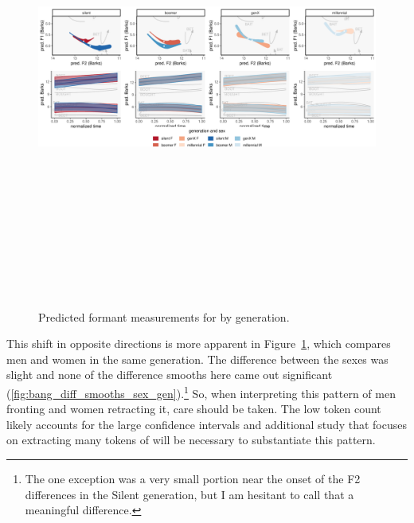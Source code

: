\begin{figure}[p]
	\centering
	\includegraphics[angle = 90, origin = c, height = 6in]{Figures/BANG/BANG_sex_panel_plot_wide.pdf}
	\caption[Predicted formant measurements for \bang by generation.]{Predicted formant measurements for \bang by generation.}
	\label{fig:BANG_sex_panel_plot_wide}
\end{figure}

This shift in opposite directions is more apparent in Figure~\ref{fig:BANG_sex_panel_plot_wide}, which compares men and women in the same generation. The difference between the sexes was slight and none of the difference smooths here came out significant (\ref{fig:bang_diff_smooths_sex_gen}).\footnote{The one exception was a very small portion near the onset of the F2 differences in the Silent generation, but I am hesitant to call that a meaningful difference.} So, when interpreting this pattern of men fronting \bang and women retracting it, care should be taken. The low token count likely accounts for the large confidence intervals and additional study that focuses on extracting many tokens of \bang will be necessary to substantiate this pattern.





